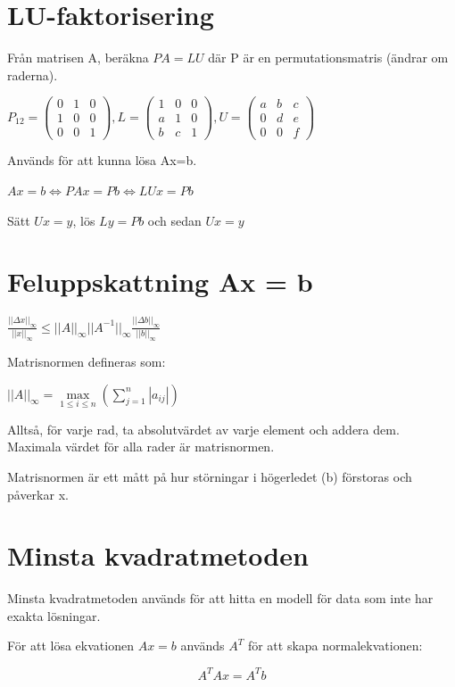 \documentclass[12pt,a4paper]{article}
\begin{document}
\section{LU-faktorisering}
Från matrisen A, beräkna $PA=LU$ där P är en permutationsmatris (ändrar om raderna).

$P_{12} =
\begin{pmatrix}
0 & 1 & 0 \\
1 & 0 & 0 \\
0 & 0 & 1
\end{pmatrix}
,
L =
\begin{pmatrix}
1 & 0 & 0 \\
a & 1 & 0 \\
b & c & 1
\end{pmatrix}
,
U =
\begin{pmatrix}
a & b & c \\
0 & d & e \\
0 & 0 & f
\end{pmatrix}
$

Används för att kunna lösa Ax=b.

$Ax = b \Leftrightarrow PAx = Pb \Leftrightarrow LUx = Pb$

Sätt $Ux = y$, lös $Ly = Pb$ och sedan $Ux = y$

\section{Feluppskattning Ax = b}
$\frac{||\Delta x||_\infty}{||x||_\infty} \leq ||A||_\infty ||A^{-1}||_\infty \frac{||\Delta b||_\infty}{||b||_\infty}$

Matrisnormen defineras som:

$ ||A||_\infty = \underset{1 \leq i \leq n}{\max} ( \sum_{j=1}^n |a_{ij}|)$

Alltså, för varje rad, ta absolutvärdet av varje element och addera dem. Maximala värdet för alla rader är matrisnormen.

Matrisnormen är ett mått på hur störningar i högerledet (b) förstoras och påverkar x.

\section{Minsta kvadratmetoden}
Minsta kvadratmetoden används för att hitta en modell för data som inte har exakta lösningar.

För att lösa ekvationen $ Ax = b$ används $A^T$ för att skapa normalekvationen:

$$ A^TAx = A^Tb $$
\end{document}
